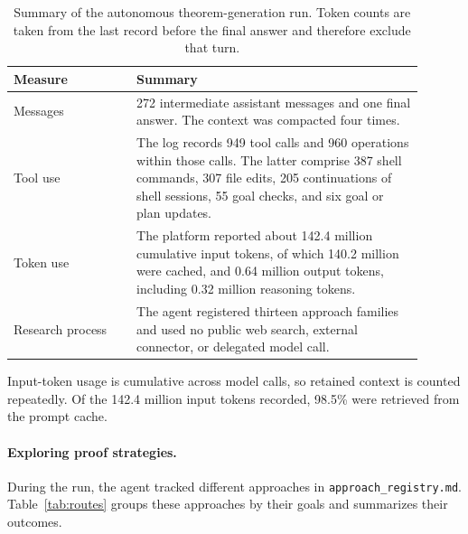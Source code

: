 \documentclass{article}
\theoremstyle{definition}
\theoremstyle{plain}
\begin{document}
\begin{table}[H]
  \caption{Summary of the autonomous theorem-generation run. Token counts are
  taken from the last record before the final answer and therefore exclude
  that turn.}
  \label{tab:autonomous-metrics}
  \centering
  \begin{tabular}{L{0.27\linewidth}L{0.63\linewidth}}
    \toprule
    Measure & Summary \\
    \midrule
    Messages
      & 272 intermediate assistant messages and one final answer. The context was compacted
        four times. \\
    Tool use
      & The log records 949 tool calls and 960 operations within those calls.
        The latter comprise 387 shell commands, 307 file edits, 205
        continuations of shell sessions, 55 goal checks, and six goal or plan
        updates. \\
    Token use
      & The platform reported about 142.4 million cumulative input tokens, of
        which 140.2 million were cached, and 0.64 million output tokens,
        including 0.32 million reasoning tokens. \\
    Research process
      & The agent registered thirteen approach families and used no public web
        search, external connector, or delegated model call. \\
    \bottomrule
  \end{tabular}
\end{table}

Input-token usage is cumulative across model calls, so retained context is counted repeatedly. Of the 142.4 million input tokens recorded, 98.5\% were retrieved from the prompt cache.

\paragraph{Exploring proof strategies.}
During the run, the agent tracked different approaches in \texttt{approach\_\allowbreak{}registry.md}. Table~\ref{tab:routes} groups these approaches by their goals and summarizes their outcomes.
\end{document}
